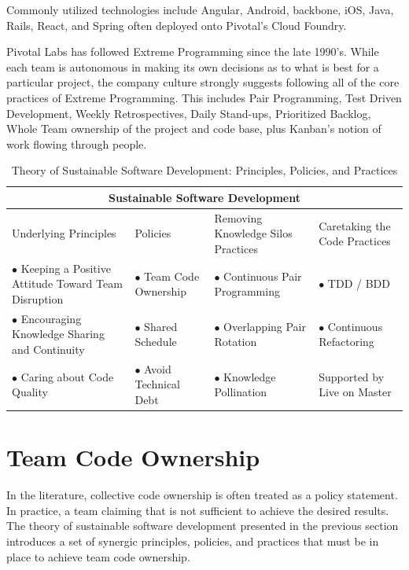 Commonly utilized technologies include Angular, Android, backbone, iOS, Java, Rails, React, and Spring often deployed onto Pivotal's Cloud Foundry. 

Pivotal Labs has followed Extreme Programming \cite{ExtremeProgramming2004} since the late 1990's. While each team is autonomous in making its own decisions as to what is best for a particular project, the company culture strongly suggests following all of the core practices of Extreme Programming. This includes Pair Programming, Test Driven Development, Weekly Retrospectives, Daily Stand-ups, Prioritized Backlog, Whole Team ownership of the project and code base, plus Kanban's notion of work flowing through people.


\begin{table}[t]
\renewcommand{\arraystretch}{1.5}
\centering
\caption{Theory of Sustainable Software Development: Principles, Policies, and Practices}
\label{SustainableSoftwareDevelopmentTable}
\begin{tabular}{|p{1.65in}|p{1.35in}|p{1.8in}|p{1.6in}|}
\hline
\multicolumn{4}{|c|}{Sustainable Software Development}                     \\
\hline
Underlying Principles & Policies                  & Removing Knowledge Silos Practices & Caretaking the Code Practices       \\
$\bullet$ Keeping a Positive Attitude Toward Team Disruption & $\bullet$ Team Code Ownership & $\bullet$ Continuous Pair Programming         & $\bullet$  TDD / BDD                   \\
$\bullet$ Encouraging Knowledge Sharing and Continuity & $\bullet$ Shared Schedule           & $\bullet$ Overlapping Pair Rotation & $\bullet$ Continuous Refactoring      \\
$\bullet$ Caring about Code Quality  & $\bullet$ Avoid Technical Debt      & $\bullet$  Knowledge Pollination    & Supported by Live on Master \\ 
\hline
\end{tabular}
\end{table}
\section{Team Code Ownership}
\label{TeamCodeOwnership}

In the literature, collective code ownership is often treated as a policy statement. In practice, a team claiming that  is not sufficient to achieve the desired results. The theory of sustainable software development presented in the previous section introduces a set of synergic principles, policies, and practices that must be in place to achieve team code ownership. 

